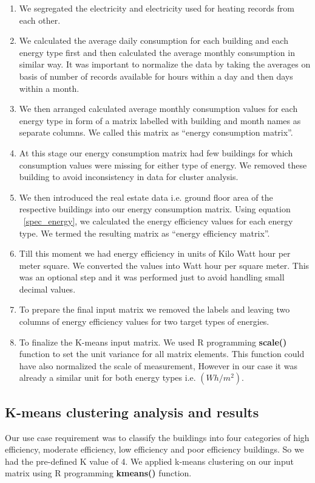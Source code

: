 \begin{enumerate}
\item We segregated the electricity and electricity used for heating records from each other.
\item We calculated the average daily consumption for each building and each energy type first and then calculated the average monthly consumption in similar way. It was important to normalize the data by taking the averages on basis of number of records available for hours within a day and then days within a month. 
\item We then arranged calculated average monthly consumption values for each energy type in form of a matrix labelled with building and month names as separate columns. We called this matrix as ``energy consumption matrix''.   
\item At this stage our energy consumption matrix had few buildings for which consumption values were missing for either type of energy. We removed these building to avoid inconsistency in data for cluster analysis. 
\item We then introduced the real estate data i.e. ground floor area of the respective buildings into our energy consumption matrix. Using equation ~\ref{spec_energy}, we calculated the energy efficiency values for each energy type. We termed the resulting matrix as ``energy efficiency matrix''.
\item Till this moment we had energy efficiency in units of Kilo Watt hour per meter square. We converted the values into Watt hour per square meter. This was an optional step and it was performed just to avoid handling small decimal values.
\item To prepare the final input matrix we removed the labels and leaving two columns of energy efficiency values for two target types of energies.
\item To finalize the K-means input matrix. We used R programming \textbf{scale()} function to set the unit variance for all matrix elements. This function could have also normalized the scale of measurement, However in our case it was already a similar unit for both energy types i.e. \((Wh/m^2)\).        
\end{enumerate}
\subsection{K-means clustering analysis and results}
Our use case requirement was to classify the buildings into four categories of high efficiency, moderate efficiency, low efficiency and poor efficiency buildings. So we had the pre-defined K value of 4. We applied k-means clustering on our input matrix using R programming \textbf{kmeans()} function.

